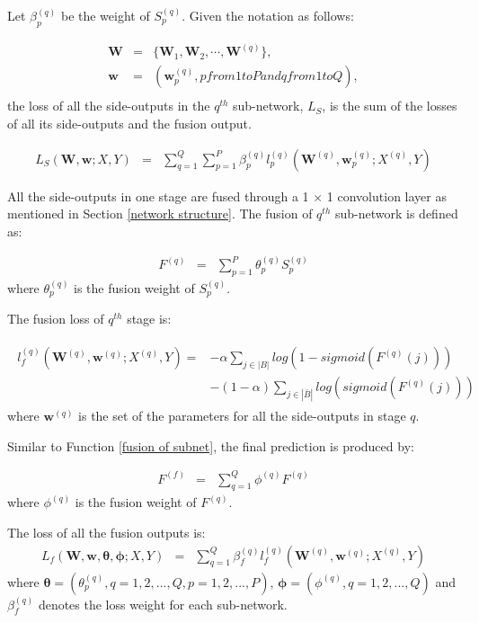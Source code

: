 \documentclass[senior]{IPSstyle}
\begin{document}
Let \(\beta_{p}^{(q)}\) be the weight of \(S_{p}^{(q)}\). Given the notation as follows:

\begin{eqnarray*}
\textbf{W} &=& \{\textbf{W}_{1}, \textbf{W}_{2}, \cdots , \textbf{W}^{(q)}\}, \\
\textbf{w} &=& (\textbf{w}_{p}^{(q)}, p from 1 to P and q from 1 to Q), \\
\end{eqnarray*}
the loss of all the side-outputs in the \(q^{th}\) sub-network, \(L_S\), is the sum of the losses of all its side-outputs and the fusion output.

\begin{eqnarray}
L_S(\textbf{W}, \textbf{w}; X, Y) &=& \sum_{q=1}^{Q}\sum_{p=1}^{P}\beta_{p}^{(q)}l_{p}^{(q)}(\textbf{W}^{(q)}, \textbf{w}_{p}^{(q)}; X^{(q)}, Y)
\end{eqnarray}

All the side-outputs in one stage are fused through a 1 \(\times\) 1 convolution layer as mentioned in Section \ref{network structure}. The fusion of \(q^{th}\) sub-network is defined as:

\begin{eqnarray} \label{fusion of subnet}
F^{(q)} &=& \sum_{p=1}^{P}\theta_{p}^{(q)}S_{p}^{(q)}
\end{eqnarray}
where \(\theta_{p}^{(q)}\) is the fusion weight of \(S_{p}^{(q)}\).

The fusion loss of \(q^{th}\) stage is:

\begin{eqnarray}
\begin{split}
l_{f}^{(q)}(\textbf{W}^{(q)}, \textbf{w}^{(q)}; X^{(q)}, Y)
=&-\alpha \sum_{j\in{|B|}}log(1 - sigmoid(F^{(q)}(j))) \\
&-(1-\alpha) \sum_{j\in{|\bar{B}|}}log(sigmoid(F^{(q)}(j)))
\end{split}
\end{eqnarray}
where \(\textbf{w}^{(q)}\) is the set of the parameters for all the side-outputs in stage \(q\).

Similar to Function \ref{fusion of subnet}, the final prediction is produced by:

\begin{eqnarray}
F^{(f)} &=& \sum_{q=1}^{Q}\phi^{(q)}F^{(q)}
\end{eqnarray}
where \(\phi^{(q)}\) is the fusion weight of \(F^{(q)}\).

The loss of all the fusion outputs is:
\begin{eqnarray}
L_{f}(\textbf{W}, \textbf{w}, \mathbf{\theta}, \mathbf{\phi}; X, Y) &=& \sum_{q=1}^{Q}\beta_{f}^{(q)}l_{f}^{(q)}(\textbf{W}^{(q)}, \textbf{w}^{(q)}; X^{(q)}, Y)
\end{eqnarray}
where \(\mathbf{\theta} = (\theta_{p}^{(q)}, q = 1, 2, ... , Q, p = 1, 2, ... , P)\), \(\mathbf{\phi} = (\phi^{(q)}, q = 1, 2, ... , Q)\) and \(\beta_{f}^{(q)}\) denotes the loss weight for each sub-network.
\end{document}
